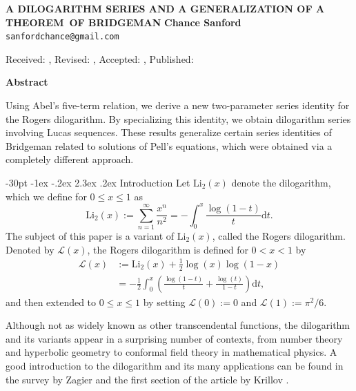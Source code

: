 \documentclass[10pt]{article}
\makeatletter
\renewcommand\section{\@startsection {section}{1}{\z@}
{-30pt \@plus -1ex \@minus -.2ex}
{2.3ex \@plus.2ex}
{\normalfont\normalsize\bfseries\boldmath}}
\theoremstyle{definition}
\makeatother
\begin{document}
\begin{center}
\uppercase{\bf \boldmath A Dilogarithm Series and a Generalization of a Theorem~of Bridgeman}
\vskip 20pt
{\bf Chance Sanford}\\
{\tt sanfordchance@gmail.com}\\
\vskip 10pt
\end{center}
\vskip 20pt

\centerline{\smallit Received: , Revised: , Accepted: , Published: } %
\vskip 30pt

\centerline{\bf Abstract}
\noindent
Using Abel’s five-term relation, we derive a new two-parameter series identity for the Rogers dilogarithm. By specializing this identity, we obtain dilogarithm series involving Lucas sequences. These results generalize certain series identities of Bridgeman related to solutions of Pell’s equations, which were obtained via a completely different approach.

\pagestyle{myheadings}
\thispagestyle{empty}
\baselineskip=12.875pt
\vskip 30pt




\section{Introduction}
Let $\mathrm{Li}_2(x)$ denote the dilogarithm, which we define for $0 \leq x \leq 1$ as
\begin{equation*}
    \mathrm{Li}_2(x) := \sum_{n=1}^{\infty}\frac{x^n}{n^2} = -\int_{0}^{x}\frac{\log(1-t)}{t}\mathrm{d}t.
\end{equation*}
The subject of this paper is a variant of $\mathrm{Li}_2(x)$, called the Rogers dilogarithm.  Denoted by $\mathcal{L}(x)$, the Rogers dilogarithm is defined for $0 < x < 1$ by 
\begin{align*}
\mathcal{L}(x) &:= \mathrm{Li}_2(x) + \frac{1}{2}\log(x)\log(1-x) \\
&= -\frac{1}{2}\int_{0}^{x}\left(\frac{\log(1-t)}{t}+\frac{\log(t)}{1-t}\right)\mathrm{d}t,
\end{align*}
and then extended to $0 \leq x \leq 1$ by setting $\mathcal{L}(0) := 0$ and $\mathcal{L}(1) := \pi^2/6$.  

Although not as widely known as other transcendental functions, the dilogarithm and its variants appear in a surprising number of contexts, from number theory and hyperbolic geometry to conformal field theory in mathematical physics.  A good introduction to the dilogarithm and its many applications can be found in the survey by Zagier \cite{zagier2007dilogarithm} and the first section of the article by Krillov \cite{kirillov1995dilogarithm}.
\end{document}
